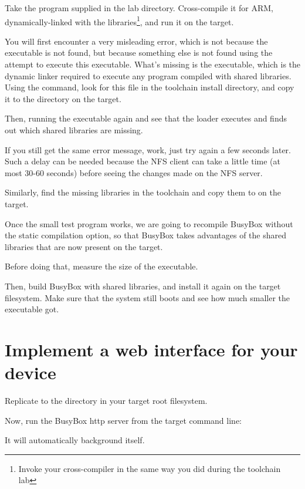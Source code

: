 Take the  program supplied in the lab 
directory. Cross-compile it for ARM, dynamically-linked with the
libraries\footnote{Invoke your cross-compiler in the same way you
did during the toolchain lab}, and run it on the target.

You will first encounter a very misleading  error,
which is not because the  executable is not found, but
because something else is not found using the attempt to execute
this executable. What's missing is the 
executable, which is the dynamic linker required to execute any
program compiled with shared libraries. Using the 
command, look for this file in the toolchain install directory,
and copy it to the  directory on the target.

Then, running the executable again and see that the loader executes
and finds out which shared libraries are missing.

If you still get the same error message, work, just try again a
few seconds later.  Such a delay can be needed because the NFS
client can take a little time (at most 30-60 seconds) before
seeing the changes made on the NFS server.

Similarly, find the missing libraries in the toolchain and copy
them to  on the target.

Once the small test program works, we are going to recompile BusyBox
without the static compilation option, so that BusyBox takes
advantages of the shared libraries that are now present on the target.

Before doing that, measure the size of the  executable.

Then, build BusyBox with shared libraries, and install it again on the
target filesystem. Make sure that the system still boots and see how
much smaller the  executable got.

\section{Implement a web interface for your device}

Replicate  to the  directory in your target
root filesystem.

Now, run the BusyBox http server from the target command line:


It will automatically background itself.

